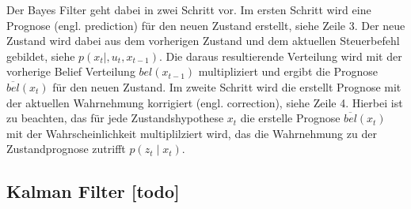 Der Bayes Filter geht dabei in zwei Schritt vor. Im ersten Schritt wird eine Prognose (engl. prediction) für den neuen Zustand erstellt, siehe Zeile 3. Der neue Zustand wird dabei aus dem vorherigen Zustand und dem aktuellen Steuerbefehl gebildet, siehe $p(x_t \mid, u_t, x_{t-1})$. Die daraus resultierende Verteilung wird mit der vorherige Belief Verteilung $bel(x_{t-1})$ multipliziert und ergibt die Prognose $\overline{bel}(x_t)$ für den neuen Zustand. Im zweite Schritt wird die erstellt Prognose mit der aktuellen Wahrnehmung korrigiert (engl. correction), siehe Zeile 4. Hierbei ist zu beachten, das für jede Zustandshypothese $x_t$ die erstelle Prognose $\overline{bel}(x_t)$ mit der Wahrscheinlichkeit multiplilziert wird, das die Wahrnehmung zu der Zustandprognose zutrifft $p(z_t \mid x_t)$.


%
%
\subsection{Kalman Filter [todo]}


